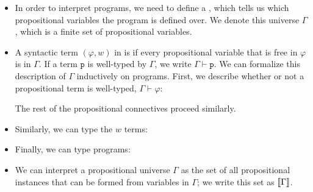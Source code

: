 \documentclass{tufte-handout}
\begin{document}
\begin{itemize}

  \item In order to interpret programs, we need to define a , which tells us which propositional variables the program is defined
  over. We denote this universe $\Gamma$, which is a finite set of propositional
  variables.

  \item A syntactic term $(\varphi,w)$ in \prop{} is  if every
  propositional variable that is free in $\varphi$ is in $\Gamma$. If a term $\texttt{p}$
  is well-typed by $\Gamma$, we write $\Gamma \vdash \texttt{p}$. We can
  formalize this description of $\Gamma$ inductively on \prop{} programs. First,
  we describe whether or not a propositional term is well-typed, $\Gamma \vdash
  \varphi$:
  The rest of the propositional connectives proceed similarly.

  \item Similarly, we can type the $w$ terms:
 
  \item Finally, we can type programs:
  \begin{mathpar}
  \end{mathpar}

  \item We can interpret a propositional universe $\Gamma$ as the set of all
  propositional instances that can be formed from variables in $\Gamma$; we 
  write this set as $\dbracket{\Gamma}$.
  
\end{itemize}
\end{document}
